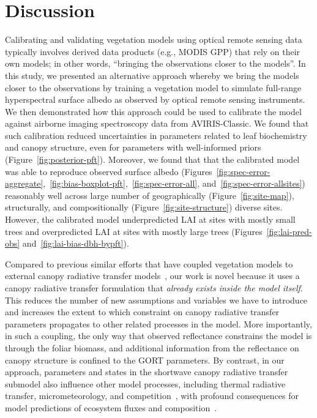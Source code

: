 \section{Discussion}

Calibrating and validating vegetation models using optical remote sensing data typically involves derived data products (e.g., MODIS GPP) that rely on their own models;
in other words, ``bringing the observations closer to the models''.
In this study, we presented an alternative approach whereby we bring the models closer to the observations by training a vegetation model to simulate full-range hyperspectral surface albedo as observed by optical remote sensing instruments.
We then demonstrated how this approach could be used to calibrate the model against airborne imaging spectroscopy data from AVIRIS-Classic.
We found that such calibration reduced uncertainties in parameters related to leaf biochemistry and canopy structure, even for parameters with well-informed priors (Figure~\ref{fig:posterior-pft}).
Moreover, we found that that the calibrated model was able to reproduce observed surface albedo
(Figures~\ref{fig:spec-error-aggregate},~\ref{fig:bias-boxplot-pft},~\ref{fig:spec-error-all}, and~\ref{fig:spec-error-allsites})
reasonably well across large number of geographically (Figure~\ref{fig:site-map}), structurally, and compositionally (Figure~\ref{fig:site-structure}) diverse sites.
However, the calibrated model underpredicted LAI at sites with mostly small trees and overpredicted LAI at sites with mostly large trees (Figures~\ref{fig:lai-pred-obs} and~\ref{fig:lai-bias-dbh-bypft}).

Compared to previous similar efforts that have coupled vegetation models to external canopy radiative transfer models~\citep{knorr2001assimilation, nouvellon2001coupling, quaife2008assimilating},
our work is novel because it uses a canopy radiative transfer formulation that \emph{already exists inside the model itself}.
This reduces the number of new assumptions and variables we have to introduce and increases the extent to which constraint on canopy radiative transfer parameters propagates to other related processes in the model.
More importantly, in such a coupling, the only way that observed reflectance constrains the model is through the foliar biomass, and additional information from the reflectance on canopy structure is confined to the GORT parameters.
By contrast, in our approach, parameters and states in the shortwave canopy radiative transfer submodel also influence other model processes, including thermal radiative transfer, micrometeorology, and competition~\citep{longo2019ed2description}, with profound consequences for model predictions of ecosystem fluxes and composition~\citep{viskari_2019_influence}.

